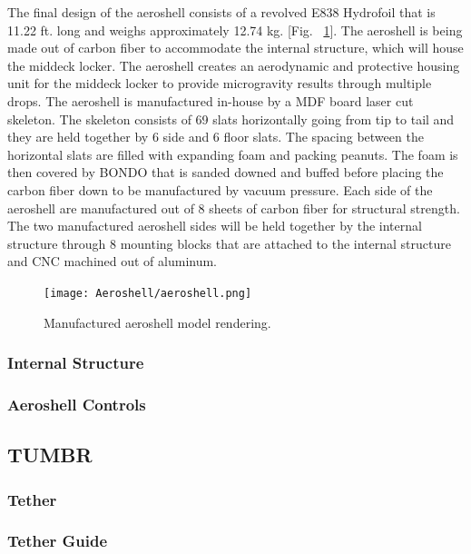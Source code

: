 \indent\indent The final design of the aeroshell consists of a revolved E838 Hydrofoil that is 11.22 ft. long and weighs approximately 12.74 kg. [Fig. ~\ref{fig:aeroshell}]. The aeroshell is being made out of carbon fiber to accommodate the internal structure, which will house the middeck locker. The aeroshell creates an aerodynamic and protective housing unit for the middeck locker to provide microgravity results through multiple drops. The aeroshell is manufactured in-house by a MDF board laser cut skeleton. The skeleton consists of 69 slats horizontally going from tip to tail and they are held together by 6 side and 6 floor slats. The spacing between the horizontal slats are filled with expanding foam and packing peanuts. The foam is then covered by BONDO that is sanded downed and buffed before placing the carbon fiber down to be manufactured by vacuum pressure. Each side of the aeroshell are manufactured out of 8 sheets of carbon fiber for structural strength. The two manufactured aeroshell sides will be held together by the internal structure through 8 mounting blocks that are attached to the internal structure and CNC machined out of aluminum.

\begin{figure}[H]
  \centering
  \texttt{[image: Aeroshell/aeroshell.png]}
  \caption{\label{fig:aeroshell}Manufactured aeroshell model rendering.}
\end{figure}

\subsubsection{Internal Structure}



\subsubsection{Aeroshell Controls}

\subsection{TUMBR}

\subsubsection{Tether}

\subsubsection{Tether Guide}

